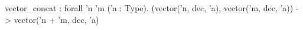 vector_concat : forall 'n 'm ('a : Type). (vector('n, dec, 'a), vector('m, dec, 'a)) -> vector('n + 'm, dec, 'a)